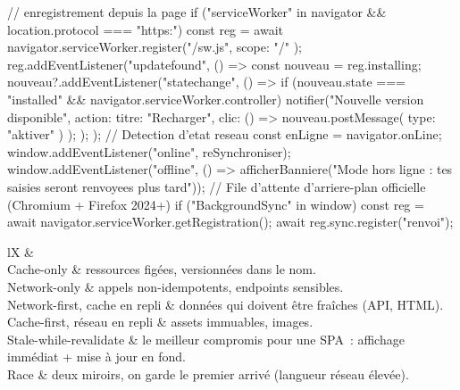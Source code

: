 \begin{codejs}
// enregistrement depuis la page
if ("serviceWorker" in navigator && location.protocol === "https:") {
  const reg = await navigator.serviceWorker.register("/sw.js", { scope: "/" });
  reg.addEventListener("updatefound", () => {
    const nouveau = reg.installing;
    nouveau?.addEventListener("statechange", () => {
      if (nouveau.state === "installed" && navigator.serviceWorker.controller) {
        notifier("Nouvelle version disponible", { action: { titre: "Recharger", clic: () => nouveau.postMessage({ type: "aktiver" }) } });
      }
    });
  });
}
// Detection d'etat reseau
const enLigne = navigator.onLine;
window.addEventListener("online", reSynchroniser);
window.addEventListener("offline", () => afficherBanniere("Mode hors ligne : tes saisies seront renvoyees plus tard"));
// File d'attente d'arriere-plan officielle (Chromium + Firefox 2024+)
if ("BackgroundSync" in window) { const reg = await navigator.serviceWorker.getRegistration(); await reg.sync.register("renvoi"); }
\end{codejs}

\begin{tabz}{lX}
  \headrow {} \&  \\
  \midrule
  Cache-only \& ressources fig\'ees, versionn\'ees dans le nom. \\
  Network-only \& appels non-idempotents, endpoints sensibles. \\
  Network-first, cache en repli \& donn\'ees qui doivent \^etre fra\^iches (API, HTML). \\
  Cache-first, r\'eseau en repli \& assets immuables, images. \\
  Stale-while-revalidate \& le meilleur compromis pour une SPA~: affichage imm\'ediat + mise \`a jour en fond. \\
  Race \& deux miroirs, on garde le premier arriv\'e (langueur r\'eseau \'elev\'ee). \\
\end{tabz}


